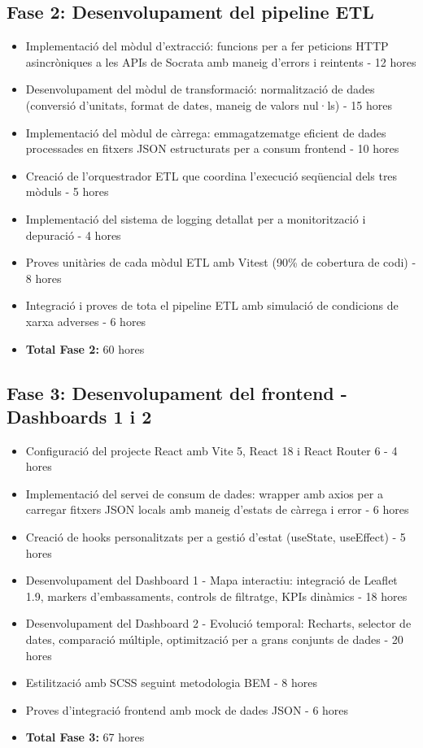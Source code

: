 \subsection{Fase 2: Desenvolupament del pipeline ETL}
\begin{itemize}
    \item Implementació del mòdul d'extracció: funcions per a fer peticions HTTP asincròniques a les APIs de Socrata amb maneig d'errors i reintents - 12 hores
    \item Desenvolupament del mòdul de transformació: normalització de dades (conversió d'unitats, format de dates, maneig de valors nul·ls) - 15 hores
    \item Implementació del mòdul de càrrega: emmagatzematge eficient de dades processades en fitxers JSON estructurats per a consum frontend - 10 hores
    \item Creació de l'orquestrador ETL que coordina l'execució seqüencial dels tres mòduls - 5 hores
    \item Implementació del sistema de logging detallat per a monitorització i depuració - 4 hores
    \item Proves unitàries de cada mòdul ETL amb Vitest (90\% de cobertura de codi) - 8 hores
    \item Integració i proves de tota el pipeline ETL amb simulació de condicions de xarxa adverses - 6 hores
    \item \textbf{Total Fase 2:} 60 hores
\end{itemize}

\subsection{Fase 3: Desenvolupament del frontend - Dashboards 1 i 2}
\begin{itemize}
    \item Configuració del projecte React amb Vite 5, React 18 i React Router 6 - 4 hores
    \item Implementació del servei de consum de dades: wrapper amb axios per a carregar fitxers JSON locals amb maneig d'estats de càrrega i error - 6 hores
    \item Creació de hooks personalitzats per a gestió d'estat (useState, useEffect) - 5 hores
    \item Desenvolupament del Dashboard 1 - Mapa interactiu: integració de Leaflet 1.9, markers d'embassaments, controls de filtratge, KPIs dinàmics - 18 hores
    \item Desenvolupament del Dashboard 2 - Evolució temporal: Recharts, selector de dates, comparació múltiple, optimització per a grans conjunts de dades - 20 hores
    \item Estilització amb SCSS seguint metodologia BEM - 8 hores
    \item Proves d'integració frontend amb mock de dades JSON - 6 hores
    \item \textbf{Total Fase 3:} 67 hores
\end{itemize}

